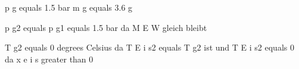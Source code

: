 p g equals 1.5 bar m g equals 3.6 g

p g2 equals p g1 equals 1.5 bar da M E W gleich bleibt

T g2 equals 0 degrees Celsius da T E i s2 equals T g2 ist und T E i s2 equals 0 da x e i s greater than 0